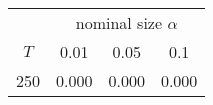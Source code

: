 % 
\begin{tabular}{cccc}
  \hline
  & \multicolumn{3}{c}{nominal size $\alpha$} \\
 $T$ & 0.01 & 0.05 & 0.1 \\
 \hline
250 & 0.000 & 0.000 & 0.000 \\ 
   \hline
\end{tabular}
